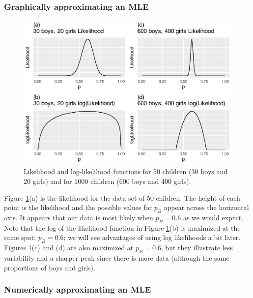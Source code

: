 \documentclass[
]{krantz}
\begin{document}
\hypertarget{MLEgph.sec}{%
\subsubsection{Graphically approximating an MLE}\label{MLEgph.sec}}

\begin{figure}

{\centering \includegraphics[width=0.9\linewidth]{bookdown-BeyondMLR_files/figure-latex/lik4-1} 

}

\caption{Likelihood and log-likelihood functions for 50 children (30 boys and 20 girls) and for 1000 children (600 boys and 400 girls).}\label{fig:lik4}
\end{figure}

Figure \ref{fig:lik4}(a) is the likelihood for the data set of 50 children. The height of each point is the likelihood and the possible values for \(p_B\) appear across the horizontal axis. It appears that our data is most likely when \(p_B = 0.6\) as we would expect. Note that the log of the likelihood function in Figure \ref{fig:lik4}(b) is maximized at the same spot: \(p_B = 0.6\); we will see advantages of using log likelihoods a bit later. Figures \ref{fig:lik4}(c) and (d) are also maximized at \(p_B = 0.6\), but they illustrate less variability and a sharper peak since there is more data (although the same proportions of boys and girls).

\hypertarget{numerically-approximating-an-mle}{%
\subsubsection{Numerically approximating an MLE}\label{numerically-approximating-an-mle}}
\end{document}
